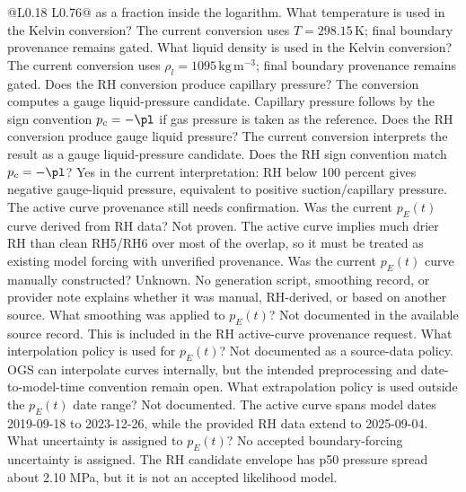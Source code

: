 \begin{longtable}{@{}L{0.18\textwidth} L{0.76\textwidth}@{}}
{as a fraction inside the logarithm.}
{ What temperature is used in the Kelvin conversion?}
{The current conversion uses \(T=298.15\,\mathrm{K}\); final boundary provenance remains
gated.}
{ What liquid density is used in the Kelvin conversion?}
{The current conversion uses \(\rho_l=1095\,\mathrm{kg\,m^{-3}}\); final boundary
provenance remains gated.}
{ Does the RH conversion produce capillary pressure?}
{The conversion computes a gauge liquid-pressure candidate.  Capillary pressure follows by
the sign convention \(p_c=-\pl\) if gas pressure is taken as the reference.}
{ Does the RH conversion produce gauge liquid pressure?}
{The current conversion interprets the result as a gauge liquid-pressure candidate.}
{ Does the RH sign convention match \(p_c=-\pl\)?}
{Yes in the current interpretation: RH below 100 percent gives negative
gauge-liquid pressure, equivalent to positive suction/capillary pressure.  The active
curve provenance still needs confirmation.}
{ Was the current \(p_E(t)\) curve derived from RH data?}
{Not proven.  The active curve implies much drier RH than clean RH5/RH6 over most of
the overlap, so it must be treated as existing model forcing with unverified
provenance.}
{ Was the current \(p_E(t)\) curve manually constructed?}
{Unknown.  No generation script, smoothing record, or provider note explains
whether it was manual, RH-derived, or based on another source.}
{ What smoothing was applied to \(p_E(t)\)?}
{Not documented in the available source record.  This is included in the RH
active-curve provenance request.}
{ What interpolation policy is used for \(p_E(t)\)?}
{Not documented as a source-data policy.  OGS can interpolate curves internally, but
the intended preprocessing and date-to-model-time convention remain open.}
{ What extrapolation policy is used outside the \(p_E(t)\) date range?}
{Not documented.  The active curve spans model dates 2019-09-18 to 2023-12-26, while
the provided RH data extend to 2025-09-04.}
{ What uncertainty is assigned to \(p_E(t)\)?}
{No accepted boundary-forcing uncertainty is assigned.  The RH candidate envelope has
p50 pressure spread about 2.10 MPa, but it is not an accepted likelihood model.}

\end{longtable}

